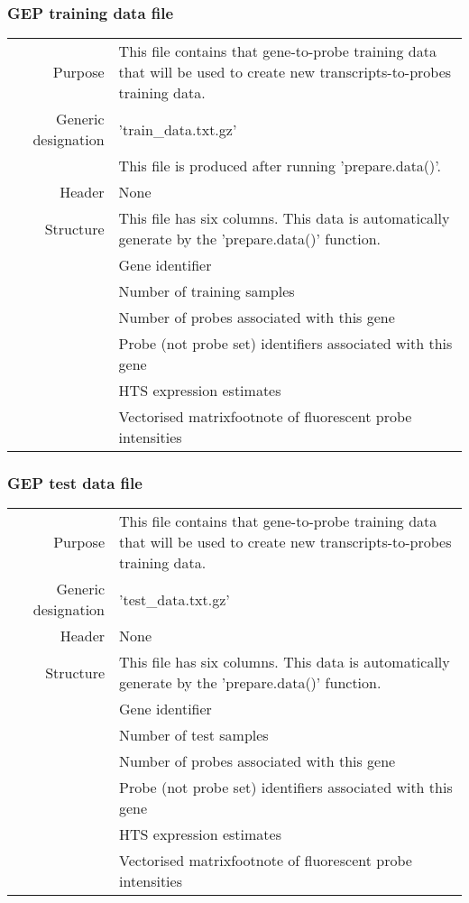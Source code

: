 \documentclass[a4paper,12pt]{article}
\begin{document}
\subsubsection{GEP training data file}
\label{tiep:gep_train}

\begin{tabular}{rp{12cm}}
Purpose & This file contains that gene-to-probe training data that will be used to create new transcripts-to-probes training data. \\
Generic designation & 'train\_data.txt.gz' \\
  & This file is produced after running 'prepare.data()'. \\
Header & None \\
Structure & This file has six columns. This data is automatically generate by the 'prepare.data()' function. \\
  & Gene identifier \\
  & Number of training samples \\
  & Number of probes associated with this gene \\
  & Probe (not probe set) identifiers associated with this gene \\
  & HTS expression estimates \\
  & Vectorised matrix{footnote} of fluorescent probe intensities \\
\end{tabular}

\subsubsection{GEP test data file}
\label{tiep:gep_test}

\begin{tabular}{rp{12cm}}
Purpose & This file contains that gene-to-probe training data that will be used to create new transcripts-to-probes training data. \\
Generic designation & 'test\_data.txt.gz' \\
Header & None \\
Structure & This file has six columns. This data is automatically generate by the 'prepare.data()' function. \\
  & Gene identifier \\
  & Number of test samples \\
  & Number of probes associated with this gene \\
  & Probe (not probe set) identifiers associated with this gene \\
  & HTS expression estimates \\
  & Vectorised matrix{footnote} of fluorescent probe intensities
\end{tabular}
\end{document}
